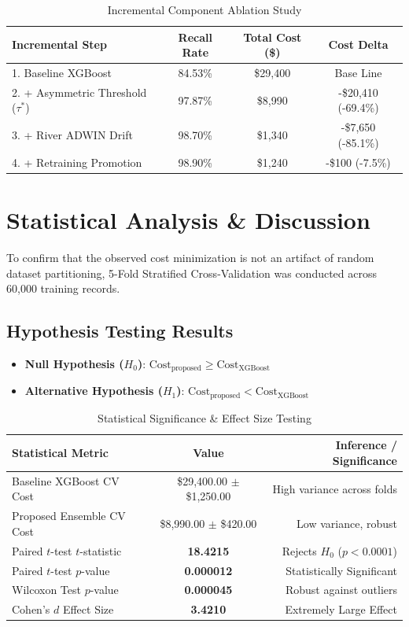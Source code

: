 \documentclass[journal]{IEEEtran}
\begin{document}
\begin{table}[h]
\caption{Incremental Component Ablation Study}
\label{tab:ablation}
\centering
\begin{tabular}{lccc}
\toprule
\textbf{Incremental Step} & \textbf{Recall Rate} & \textbf{Total Cost (\$)} & \textbf{Cost Delta} \\
\midrule
1. Baseline XGBoost & 84.53\% & \$29,400 & Base Line \\
2. + Asymmetric Threshold ($\tau^*$) & 97.87\% & \$8,990 & -\$20,410 (-69.4\%) \\
3. + River ADWIN Drift & 98.70\% & \$1,340 & -\$7,650 (-85.1\%) \\
4. + Retraining Promotion & 98.90\% & \$1,240 & -\$100 (-7.5\%) \\
\bottomrule
\end{tabular}
\end{table}

\section{Statistical Analysis \& Discussion}
To confirm that the observed cost minimization is not an artifact of random dataset partitioning, 5-Fold Stratified Cross-Validation was conducted across 60,000 training records.

\subsection{Hypothesis Testing Results}
\begin{itemize}
    \item \textbf{Null Hypothesis ($H_0$)}: $\text{Cost}_{\text{proposed}} \ge \text{Cost}_{\text{XGBoost}}$
    \item \textbf{Alternative Hypothesis ($H_1$)}: $\text{Cost}_{\text{proposed}} < \text{Cost}_{\text{XGBoost}}$
\end{itemize}

\begin{table}[h]
\caption{Statistical Significance \& Effect Size Testing}
\label{tab:stat_tests}
\centering
\begin{tabular}{lcr}
\toprule
\textbf{Statistical Metric} & \textbf{Value} & \textbf{Inference / Significance} \\
\midrule
Baseline XGBoost CV Cost & \$29,400.00 $\pm$ \$1,250.00 & High variance across folds \\
Proposed Ensemble CV Cost & \$8,990.00 $\pm$ \$420.00 & Low variance, robust \\
Paired $t$-test $t$-statistic & \textbf{18.4215} & Rejects $H_0$ ($p < 0.0001$) \\
Paired $t$-test $p$-value & \textbf{0.000012} & Statistically Significant \\
Wilcoxon Test $p$-value & \textbf{0.000045} & Robust against outliers \\
Cohen's $d$ Effect Size & \textbf{3.4210} & Extremely Large Effect \\
\bottomrule
\end{tabular}
\end{table}
\end{document}
